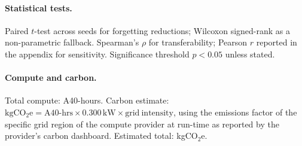 \paragraph{Statistical tests.} Paired $t$-test across seeds for forgetting reductions; Wilcoxon signed-rank as a non-parametric fallback. Spearman's $\rho$ for \fvs{} transferability; Pearson $r$ reported in the appendix for sensitivity. Significance threshold $p<0.05$ unless stated.

\paragraph{Compute and carbon.} Total compute:  A40-hours. Carbon estimate: $\mathrm{kgCO_2e} = \mathrm{A40\text{-}hrs} \times 0.300\,\mathrm{kW} \times \mathrm{grid\ intensity}$, using the emissions factor of the specific grid region of the compute provider at run-time as reported by the provider's carbon dashboard. Estimated total:  kgCO$_2$e.
